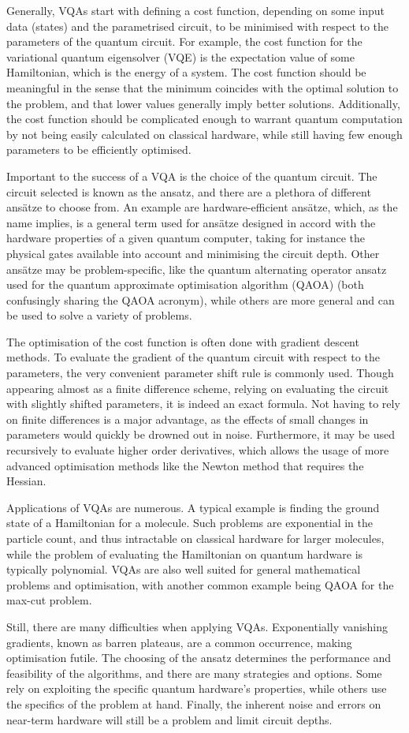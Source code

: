 Generally, VQAs start with defining a cost function, depending on some input data (states) and the parametrised circuit, to be minimised with respect to the parameters of the quantum circuit.
For example, the cost function for the variational quantum eigensolver (VQE) is the expectation value of some Hamiltonian, which is the energy of a system.
The cost function should be meaningful in the sense that the minimum coincides with the optimal solution to the problem, and that lower values generally imply better solutions.
Additionally, the cost function should be complicated enough to warrant quantum computation by not being easily calculated on classical hardware, while still having few enough parameters to be efficiently optimised.

Important to the success of a VQA is the choice of the quantum circuit.
The circuit selected is known as the ansatz, and there are a plethora of different ansätze to choose from.
An example are hardware-efficient ansätze, which, as the name implies, is a general term used for ansätze designed in accord with the hardware properties of a given quantum computer, taking for instance the physical gates available into account and minimising the circuit depth.
Other ansätze may be problem-specific, like the quantum alternating operator ansatz used for the quantum approximate optimisation algorithm (QAOA) (both confusingly sharing the QAOA acronym), while others are more general and can be used to solve a variety of problems.

The optimisation of the cost function is often done with gradient descent methods.
To evaluate the gradient of the quantum circuit with respect to the parameters, the very convenient parameter shift rule is commonly used.
Though appearing almost as a finite difference scheme, relying on evaluating the circuit with slightly shifted parameters, it is indeed an exact formula.
Not having to rely on finite differences is a major advantage, as the effects of small changes in parameters would quickly be drowned out in noise.
Furthermore, it may be used recursively to evaluate higher order derivatives, which allows the usage of more advanced optimisation methods like the Newton method that requires the Hessian.

Applications of VQAs are numerous.
A typical example is finding the ground state of a Hamiltonian for a molecule.
Such problems are exponential in the particle count, and thus intractable on classical hardware for larger molecules, while the problem of evaluating the Hamiltonian on quantum hardware is typically polynomial.
VQAs are also well suited for general mathematical problems and optimisation, with another common example being QAOA for the max-cut problem.

Still, there are many difficulties when applying VQAs.
Exponentially vanishing gradients, known as barren plateaus, are a common occurrence, making optimisation futile.
The choosing of the ansatz determines the performance and feasibility of the algorithms, and there are many strategies and options.
Some rely on exploiting the specific quantum hardware's properties, while others use the specifics of the problem at hand.
Finally, the inherent noise and errors on near-term hardware will still be a problem and limit circuit depths.